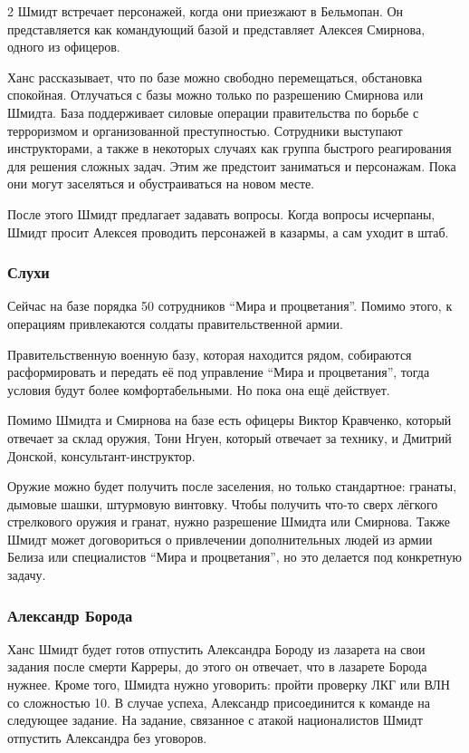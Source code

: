\documentclass[twoside]{article}
\begin{document}
\begin{multicols}{2}
Шмидт встречает персонажей, когда они приезжают в Бельмопан. Он
представляется как командующий базой и представляет Алексея Смирнова,
одного из офицеров.

Ханс рассказывает, что по базе можно свободно перемещаться, обстановка
спокойная. Отлучаться с базы можно только по разрешению Смирнова или
Шмидта. База поддерживает силовые операции правительства по борьбе с
терроризмом и организованной преступностью. Сотрудники выступают
инструкторами, а также в некоторых случаях как группа быстрого
реагирования для решения сложных задач. Этим же предстоит заниматься и
персонажам. Пока они могут заселяться и обустраиваться на новом месте.

После этого Шмидт предлагает задавать вопросы. Когда вопросы исчерпаны,
Шмидт просит Алексея проводить персонажей в казармы, а сам уходит в
штаб.

\subsubsection{Слухи}\label{rumors-schmidt}

Сейчас на базе порядка 50 сотрудников \enquote{Мира и процветания}. Помимо
этого, к операциям привлекаются солдаты правительственной армии.

Правительственную военную базу, которая находится рядом, собираются
расформировать и передать её под управление \enquote{Мира и процветания}, тогда
условия будут более комфортабельными. Но пока она ещё действует.

Помимо Шмидта и Смирнова на базе есть офицеры Виктор Кравченко, который
отвечает за склад оружия, Тони Нгуен, который отвечает за технику, и
Дмитрий Донской, консультант-инструктор.

Оружие можно будет получить после заселения, но только стандартное:
гранаты, дымовые шашки, штурмовую винтовку. Чтобы получить что-то сверх
лёгкого стрелкового оружия и гранат, нужно разрешение Шмидта или
Смирнова. Также Шмидт может договориться о привлечении дополнительных
людей из армии Белиза или специалистов \enquote{Мира и процветания}, но это
делается под конкретную задачу.

\subsubsection{Александр Борода}\label{alexander-beard}

Ханс Шмидт будет готов отпустить Александра Бороду из лазарета на свои
задания после смерти Карреры, до этого он отвечает, что в лазарете
Борода нужнее. Кроме того, Шмидта нужно уговорить: пройти проверку
ЛКГ или ВЛН со сложностью 10. В случае успеха, Александр присоединится к команде
на следующее задание. На задание, связанное с атакой националистов Шмидт
отпустить Александра без уговоров.


\end{multicols}
\end{document}
